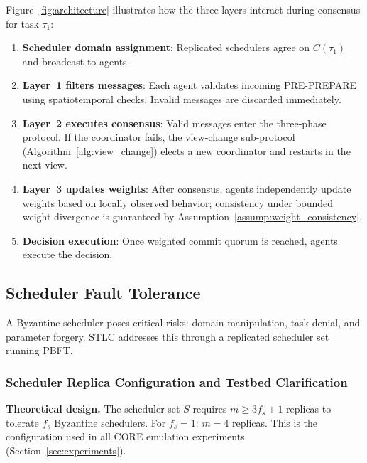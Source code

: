\documentclass[manuscript,screen,review]{acmart}
\begin{document}
Figure~\ref{fig:architecture} illustrates how the three layers interact during consensus for task $\tau_1$:

\begin{enumerate}
\item \textbf{Scheduler domain assignment}: Replicated schedulers agree on $C(\tau_1)$ and broadcast to agents.
\item \textbf{Layer~1 filters messages}: Each agent validates incoming PRE-PREPARE using spatiotemporal checks. Invalid messages are discarded immediately.
\item \textbf{Layer~2 executes consensus}: Valid messages enter the three-phase protocol. If the coordinator fails, the view-change sub-protocol (Algorithm~\ref{alg:view_change}) elects a new coordinator and restarts in the next view.
\item \textbf{Layer~3 updates weights}: After consensus, agents independently update weights based on locally observed behavior; consistency under bounded weight divergence is guaranteed by Assumption~\ref{assump:weight_consistency}.
\item \textbf{Decision execution}: Once weighted commit quorum is reached, agents execute the decision.
\end{enumerate}

\subsection{Scheduler Fault Tolerance}
\label{sec:scheduler_ft}

A Byzantine scheduler poses critical risks: domain manipulation, task denial, and parameter forgery. STLC addresses this through a replicated scheduler set running PBFT.

\subsubsection{Scheduler Replica Configuration and Testbed Clarification}
\label{sec:scheduler_config}

\textbf{Theoretical design.} The scheduler set $S$ requires $m \geq 3f_s + 1$ replicas to tolerate $f_s$ Byzantine schedulers. For $f_s = 1$: $m = 4$ replicas. This is the configuration used in all CORE emulation experiments (Section~\ref{sec:experiments}).
\end{document}
